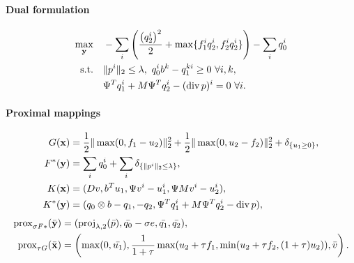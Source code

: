 \paragraph{Dual formulation}
\begin{align*}
    \max_{\mathbf{y}} \quad
        & -\sum_i \left(
                \frac{\left(q_2^i\right)^2}{2} + \max\{f_1^i q_2^i,f_2^i q_2^i\}
        \right) - \sum_i q_0^i  \\
    \text{s.t.}\quad
        & \|p^{i}\|_{2} \leq \lambda,
          ~q_0^i b^k - q_1^{ki} \geq 0 ~\forall i, k, \\
        & \Psi^T q_1^i + M \Psi^T q_2^i - (\operatorname{div} p)^i = 0 ~\forall i.
\end{align*}

\paragraph{Proximal mappings}
\begin{align*}
    G(\mathbf{x}) &=
        \frac{1}{2} \|\max(0, f_1 - u_2)\|_2^2
        + \frac{1}{2} \|\max(0, u_2 - f_2)\|_2^2
        + \delta_{\{u_1 \geq 0\}}, \\
    F^*(\mathbf{y}) &=
        \sum_{i} q_0^i
        + \sum_{i} \delta_{\{\|p^{i}\|_{2} \leq \lambda\}}, \\
    K(\mathbf{x}) &= (
        Dv,
        b^T u_1,
        \Psi v^i - u_1^i,
        \Psi M v^i - u_2^i
    ), \\
    K^*(\mathbf{y}) &= (
        q_0 \otimes b - q_1,
        -q_2,
        \Psi^T q_1^i + M \Psi^T q_2^i - \operatorname{div}{p}
    ),
\end{align*}
\begin{align*}
    \operatorname{prox}_{\sigma F*}(\bar{\mathbf{y}})
    &= (
        \operatorname{proj}_{\lambda,2}(\bar{p}),
        \bar{q_0}-\sigma e,
        \bar{q_1},
        \bar{q_2}
   ), \\
    \operatorname{prox}_{\tau G}(\bar{\mathbf{x}})
    &= \left(
        \max(0,\bar{u_1}),
        \frac{1}{1 + \tau} \max(u_2 + \tau f_1,
                                \min(u_2 + \tau f_2, (1 + \tau)u_2)),
        \bar{v}
    \right).
\end{align*}
